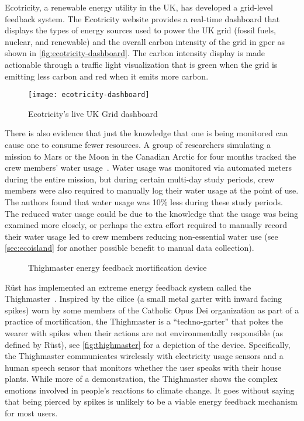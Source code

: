 Ecotricity, a renewable energy utility in the UK, has developed a grid-level feedback system. The Ecotricity website provides a real-time dashboard that displays the types of energy sources used to power the UK grid (fossil fuels, nuclear, and renewable) and the overall carbon intensity of the grid in g\COtwo per \kWh as shown in \autoref{fig:ecotricity-dashboard}. The carbon intensity display is made actionable through a traffic light visualization that is green when the grid is emitting less carbon and red when it emits more carbon. 

\begin{figure}[htbp]
	\centering
		\texttt{[image: ecotricity-dashboard]}
		\caption{Ecotricity's live UK Grid dashboard}
		\label{fig:ecotricity-dashboard}
\end{figure}

There is also evidence that just the knowledge that one is being monitored can cause one to consume fewer resources. A group of researchers simulating a mission to Mars or the Moon in the Canadian Arctic for four months tracked the crew members' water usage~\cite{Bamsey2008FMARS}. Water usage was monitored via automated meters during the entire mission, but during certain multi-day study periods, crew members were also required to manually log their water usage at the point of use. The authors found that water usage was 10\% less during these study periods. The reduced water usage could be due to the knowledge that the usage was being examined more closely, or perhaps the extra effort required to manually record their water usage led to crew members reducing non-essential water use (see \autoref{sec:ecoisland} for another possible benefit to manual data collection).

\begin{figure}[htbp]
	\centering
		\caption{Thighmaster energy feedback mortification device}
		\label{fig:thighmaster}
\end{figure}

R\"{u}st has implemented an extreme energy feedback system called the Thighmaster~\cite{Rust2008Thighmaster-web}. Inspired by the cilice (a small metal garter with inward facing spikes) worn by some members of the Catholic Opus Dei organization as part of a practice of mortification, the Thighmaster is a ``techno-garter'' that pokes the wearer with spikes when their actions are not environmentally responsible (as defined by R\"{u}st), see \autoref{fig:thighmaster} for a depiction of the device. Specifically, the Thighmaster communicates wirelessly with electricity usage sensors and a human speech sensor that monitors whether the user speaks with their house plants. While more of a demonstration, the Thighmaster shows the complex emotions involved in people's reactions to climate change. It goes without saying that being pierced by spikes is unlikely to be a viable energy feedback mechanism for most users.

